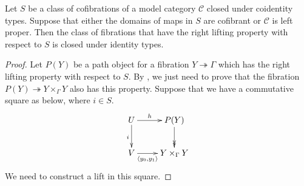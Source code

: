\documentclass[reqno]{amsart}
\theoremstyle{definition}
\theoremstyle{remark}
\newcommand{\scat}[1]{\mathcal{#1}}
\numberwithin{figure}{section}
\begin{document}
\begin{lem}[coidentity]
Let $S$ be a class of cofibrations of a model category $\scat{C}$ closed under coidentity types.
Suppose that either the domains of maps in $S$ are cofibrant or $\scat{C}$ is left proper.
Then the class of fibrations that have the right lifting property with respect to $S$ is closed under identity types.
\end{lem}
\begin{proof}
Let $P(Y)$ be a path object for a fibration $Y \twoheadrightarrow \Gamma$ which has the right lifting property with respect to $S$.
By , we just need to prove that the fibration $P(Y) \twoheadrightarrow Y \times_\Gamma Y$ also has this property.
Suppose that we have a commutative square as below, where $i \in S$.
\[ \xymatrix{ U \ar[r]^-h \ar[d]_i                  & P(Y) \ar@{->>}[d] \\
              V \ar[r]_-{\langle y_0, y_1 \rangle}  & Y \times_\Gamma Y
            } \]
We need to construct a lift in this square.


\end{proof}
\end{document}
